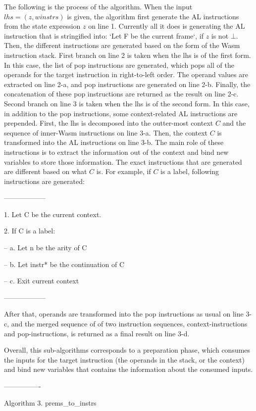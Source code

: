 The following is the process of the algorithm.
When the input $lhs = (z, winstrs)$ is given, the algorithm first
generate the AL instructions from the state expression $z$ on line 1.
Currently all it does is generating the AL instruction that is stringified into:
`Let F be the current frame`, if $z$ is not $\bot$. Then, the different instructions are
generated based on the form of the Wasm instruction stack. First branch on line 2 is taken
when the lhs is of the first form. In this case, the list of pop instructions are generated,
which pops all of the operands for the target instruction in right-to-left order.
The operand values are extracted on line 2-a, and pop instructions are generated on line 2-b.
Finally, the concatenation of these pop instructions are returned as the result on line 2-c.
Second branch on line 3 is taken when the lhs is of the second form.
In this case, in addition to the pop instructions, some context-related AL instructions are prepended.
First, the lhs is decomposed into the outter-most context $C$ and the sequence of inner-Wasm instructions on line 3-a.
Then, the context $C$ is transformed into the AL instructions on line 3-b.
The main role of these instructions is to extract the information out of the context
and bind new variables to store those information.
The exact instructions that are generated are different based on what $C$ is.
For example, if $C$ is a label, following instructions are generated:

------------------

1. Let C be the current context.

2. If C is a label:

-- a. Let n be the arity of C

-- b. Let instr* be the continuation of C

-- c. Exit current context

------------------

After that, operands are transformed into the pop instructions as usual on line 3-c,
and the merged sequence of of two instruction sequences, context-instructions and pop-instructions, is
returned as a final result on line 3-d.

Overall, this sub-algorithms corresponds to a preparation phase, which consumes the
inputs for the target instruction (the operands in the stack, or the context) and
bind new variables that contains the information about the consumed inputs.

----------------

Algorithm 3. prems\_to\_instrs

